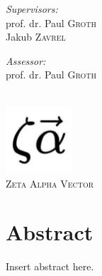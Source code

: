 \documentclass[12pt]{extreport}
\begin{document}
\begin{titlepage}
\noindent
\begin{minipage}[t]{0.4\textwidth}
\begin{flushleft} \large
\emph{Supervisors:} \\
prof. dr. Paul \textsc{Groth}\\
Jakub \textsc{Zavrel}
\end{flushleft}
\end{minipage}
\begin{minipage}[t]{0.4\textwidth}
\begin{flushright} \large
\emph{Assessor:} \\
prof. dr. Paul \textsc{Groth}\\
\end{flushright}
\end{minipage}\\[2cm]


\includegraphics[width=2.5cm]{assets/logos/zeta-alpha-logo.jpg}\\ %
\textsc{\large Zeta Alpha Vector}\\[1.0cm] %
 

\vfill %

\end{titlepage}

\chapter*{Abstract}

Insert abstract here.
\end{document}
